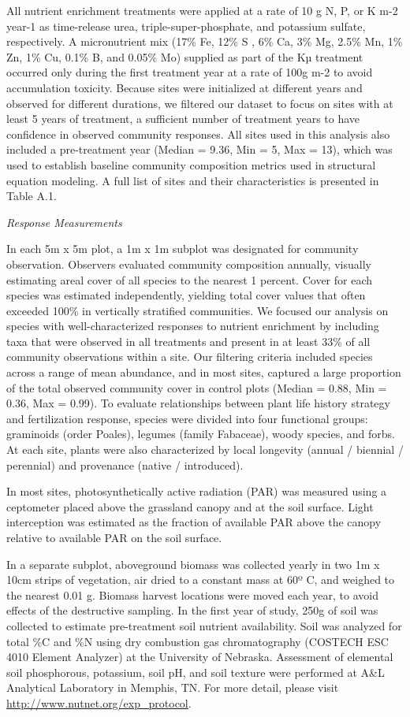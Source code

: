 \documentclass[twoside,12pt,final]{ucthesis-CA2012}
\begin{document}
\begin{ucmainmatter}
All nutrient enrichment treatments were applied at a rate of 10 g N, P, or K m-2 year-1 as time-release urea, triple-super-phosphate, and potassium sulfate, respectively. A micronutrient mix (17\% Fe, 12\% S , 6\% Ca, 3\% Mg, 2.5\% Mn, 1\% Zn, 1\% Cu, 0.1\% B, and 0.05\% Mo) supplied as part of the Kµ treatment occurred only during the first treatment year at a rate of 100g m-2 to avoid accumulation toxicity.
Because sites were initialized at different years and observed for different durations, we filtered our dataset to focus on sites with at least 5 years of treatment, a sufficient number of treatment years to have confidence in observed community responses. All sites used in this analysis also included a pre-treatment year (Median = 9.36, Min = 5, Max = 13), which was used to establish baseline community composition metrics used in structural equation modeling. A full list of sites and their characteristics is presented in Table A.1.

\emph{Response Measurements}

In each 5m x 5m plot, a 1m x 1m subplot was designated for community observation. Observers evaluated community composition annually, visually estimating areal cover of all species to the nearest 1 percent. Cover for each species was estimated independently, yielding total cover values that often exceeded 100\% in vertically stratified communities. We focused our analysis on species with well-characterized responses to nutrient enrichment by including taxa that were observed in all treatments and present in at least 33\% of all community observations within a site. Our filtering criteria included species across a range of mean abundance, and in most sites, captured a large proportion of the total observed community cover in control plots (Median = 0.88, Min = 0.36, Max = 0.99).
To evaluate relationships between plant life history strategy and fertilization response, species were divided into four functional groups: graminoids (order Poales), legumes (family Fabaceae), woody species, and forbs. At each site, plants were also characterized by local longevity (annual / biennial / perennial) and provenance (native / introduced).

In most sites, photosynthetically active radiation (PAR) was measured using a ceptometer placed above the grassland canopy and at the soil surface. Light interception was estimated as the fraction of available PAR above the canopy relative to available PAR on the soil surface.

In a separate subplot, aboveground biomass was collected yearly in two 1m x 10cm strips of vegetation, air dried to a constant mass at 60º C, and weighed to the nearest 0.01 g. Biomass harvest locations were moved each year, to avoid effects of the destructive sampling. In the first year of study, 250g of soil was collected to estimate pre-treatment soil nutrient availability. Soil was analyzed for total \%C and \%N using dry combustion gas chromatography (COSTECH ESC 4010 Element Analyzer) at the University of Nebraska. Assessment of elemental soil phosphorous, potassium, soil pH, and soil texture were performed at A\&L Analytical Laboratory in Memphis, TN. For more detail, please visit \url{http://www.nutnet.org/exp_protocol}.


\end{ucmainmatter}
\end{document}
